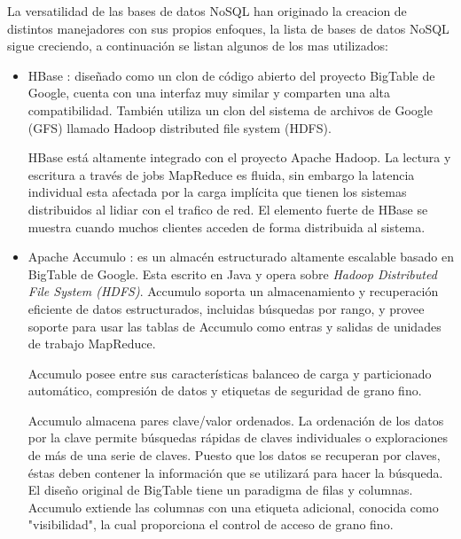 \begin{itemize}
\end{itemize}

La versatilidad de las bases de datos NoSQL han originado la creacion de distintos manejadores con sus propios enfoques, la lista de bases de datos NoSQL sigue creciendo, a continuación se listan algunos de los mas utilizados:
\begin{itemize}
\item HBase : diseñado como un clon de código abierto del proyecto BigTable de Google, cuenta con una interfaz muy similar y comparten una alta compatibilidad. También utiliza un clon del sistema de archivos de Google (GFS) llamado Hadoop distributed file system (HDFS).\cite{dataglossary}

HBase está altamente integrado con el proyecto Apache Hadoop. La lectura y escritura a través de jobs MapReduce es fluida, sin embargo la latencia individual esta afectada por la carga implícita que tienen los sistemas distribuidos al lidiar con el trafico de red. El elemento fuerte de HBase se muestra cuando muchos clientes acceden de forma distribuida al sistema.\cite{dataglossary}

\item Apache Accumulo : es un almacén estructurado altamente escalable basado en BigTable de Google. Esta escrito en Java y opera sobre \emph{Hadoop Distributed File System (HDFS)}. Accumulo soporta un almacenamiento y recuperación eficiente de datos estructurados, incluidas búsquedas por rango, y provee soporte para usar las tablas de Accumulo como entras y salidas de unidades de trabajo MapReduce.\cite{manualacumulo}

Accumulo posee entre sus características balanceo de carga y particionado automático, compresión de datos y etiquetas de seguridad de grano fino.\cite{manualacumulo}

Accumulo almacena pares clave/valor ordenados. La ordenación de los datos por la clave
permite búsquedas rápidas de claves individuales o exploraciones de más de una serie de
claves. Puesto que los datos se recuperan por claves, éstas deben contener la información que
se utilizará para hacer la búsqueda. \cite{13}
El diseño original de BigTable tiene un paradigma de filas y columnas. Accumulo extiende las
columnas con una etiqueta adicional, conocida como "visibilidad", la cual proporciona el control
de acceso de grano fino.\cite{13}



\end{itemize}
